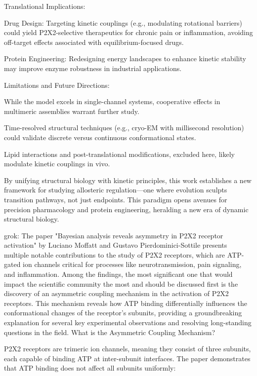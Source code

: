 \documentclass[a4paper,12pt]{article}
\begin{document}
		Translational Implications:
		
		Drug Design: Targeting kinetic couplings (e.g., modulating rotational barriers) could yield P2X2-selective therapeutics for chronic pain or inflammation, avoiding off-target effects associated with equilibrium-focused drugs.
		
		Protein Engineering: Redesigning energy landscapes to enhance kinetic stability may improve enzyme robustness in industrial applications.
		
		Limitations and Future Directions:
		
		While the model excels in single-channel systems, cooperative effects in multimeric assemblies warrant further study.
		
		Time-resolved structural techniques (e.g., cryo-EM with millisecond resolution) could validate discrete versus continuous conformational states.
		
		Lipid interactions and post-translational modifications, excluded here, likely modulate kinetic couplings in vivo.
		
		By unifying structural biology with kinetic principles, this work establishes a new framework for studying allosteric regulation—one where evolution sculpts transition pathways, not just endpoints. This paradigm opens avenues for precision pharmacology and protein engineering, heralding a new era of dynamic structural biology.
		
		
		grok: The paper "Bayesian analysis reveals asymmetry in P2X2 receptor activation" by Luciano Moffatt and Gustavo Pierdominici-Sottile presents multiple notable contributions to the study of P2X2 receptors, which are ATP-gated ion channels critical for processes like neurotransmission, pain signaling, and inflammation. Among the findings, the most significant one that would impact the scientific community the most and should be discussed first is the discovery of an asymmetric coupling mechanism in the activation of P2X2 receptors. This mechanism reveals how ATP binding differentially influences the conformational changes of the receptor's subunits, providing a groundbreaking explanation for several key experimental observations and resolving long-standing questions in the field.
		What is the Asymmetric Coupling Mechanism?
		
		P2X2 receptors are trimeric ion channels, meaning they consist of three subunits, each capable of binding ATP at inter-subunit interfaces. The paper demonstrates that ATP binding does not affect all subunits uniformly:
		
\end{document}
